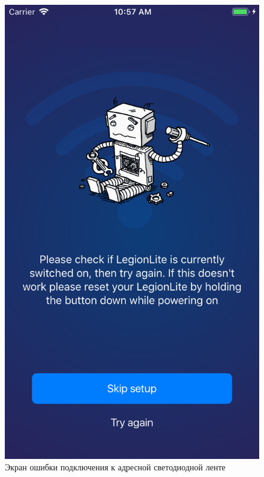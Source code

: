 ~
\begin{figure}[H]
\centering
	\includegraphics[scale=0.2]{figures/userGuide/failedLoading.png}
	\caption{Экран ошибки подключения к адресной светодиодной ленте}
	\label{fig:develop:userGuide:failedLoading}
\end{figure}
~
